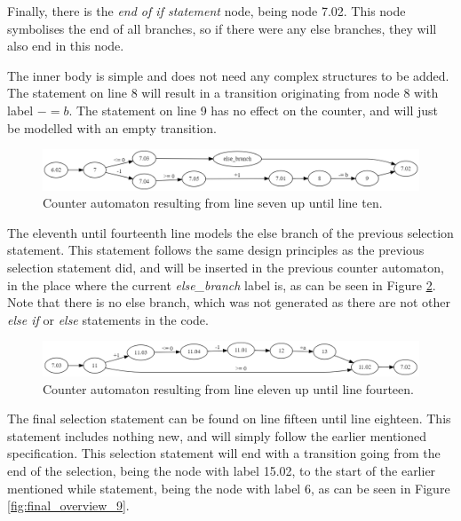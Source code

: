 \documentclass[12pt]{article}
\begin{document}
Finally, there is the \textit{end of if statement} node, being node 7.02. This node symbolises the end of all branches, so if there were any else branches, they will also end in this node.

The inner body is simple and does not need any complex structures to be added. The statement on line 8 will result in a transition originating from node 8 with label $-= b$. The statement on line 9 has no effect on the counter, and will just be modelled with an empty transition.

\begin{figure}[h]
	\centering
	\includegraphics[width=\linewidth]{final_overview_7}
	\caption{Counter automaton resulting from line seven up until line ten.}
	\label{fig:final_overview_7}
\end{figure}

The eleventh until fourteenth line models the else branch of the previous selection statement. This statement follows the same design principles as the previous selection statement did, and will be inserted in the previous counter automaton, in the place where the current \textit{else\_branch} label is, as can be seen in Figure \ref{fig:final_overview_8}. Note that there is no else branch, which was not generated as there are not other \textit{else if} or \textit{else} statements in the code.

\begin{figure}[h]
	\centering
	\includegraphics[width=\linewidth]{final_overview_8}
	\caption{Counter automaton resulting from line eleven up until line fourteen.}
	\label{fig:final_overview_8}
\end{figure}

The final selection statement can be found on line fifteen until line eighteen. This statement includes nothing new, and will simply follow the earlier mentioned specification. This selection statement will end with a transition going from the end of the selection, being the node with label 15.02, to the start of the earlier mentioned while statement, being the node with label 6, as can be seen in Figure \ref{fig:final_overview_9}.
\end{document}
